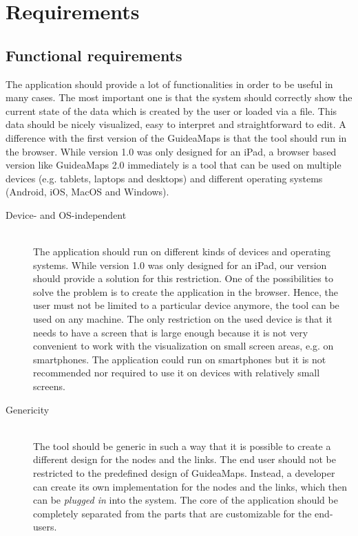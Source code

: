 \chapter{Requirements}\label{ch:requirements}

\section{Functional requirements}\label{sec:functional-requirements}
The application should provide a lot of functionalities in order to be useful in many cases. The most important one is that the system should correctly show the current state of the data which is created by the user or loaded via a file. This data should be nicely visualized, easy to interpret and straightforward to edit. A difference with the first version of the GuideaMaps is that the tool should run in the browser. While version 1.0 was only designed for an iPad, a browser based version like GuideaMaps 2.0 immediately is a tool that can be used on multiple devices (e.g. tablets, laptops and desktops) and different operating systems (Android, iOS, MacOS and Windows).

\begin{description}

  \item[Device- and OS-independent] \hfill \\
  The application should run on different kinds of devices and operating systems. While version 1.0 was only designed for an iPad, our version should provide a solution for this restriction. One of the possibilities to solve the problem is to create the application in the browser. Hence, the user must not be limited to a particular device anymore, the tool can be used on any machine. The only restriction on the used device is that it needs to have a screen that is large enough because it is not very convenient to work with the visualization on small screen areas, e.g. on smartphones. The application could run on smartphones but it is not recommended nor required to use it on devices with relatively small screens.
  
  \item[Genericity] \hfill \\
  The tool should be generic in such a way that it is possible to create a different design for the nodes and the links. The end user should not be restricted to the predefined design of GuideaMaps. Instead, a developer can create its own implementation for the nodes and the links, which then can be \textit{plugged in} into the system. The core of the application should be completely separated from the parts that are customizable for the end-users.
  
\end{description}




